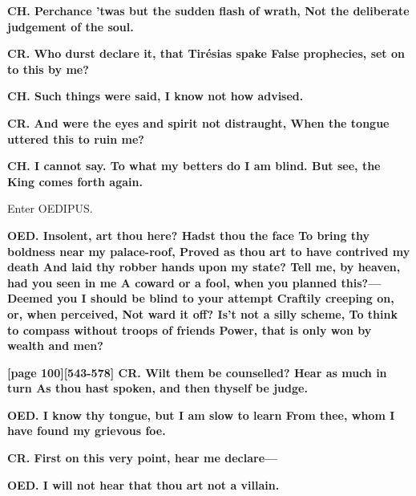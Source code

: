 \documentclass[11pt,letter]{book}
\begin{document}
\par \textbf{CH. Perchance ’twas but the sudden flash of wrath, Not the deliberate judgement of the soul.}
\par 

\par \textbf{CR. Who durst declare it, that Tirésias spake False prophecies, set on to this by me?}
\par 

\par \textbf{CH. Such things were said, I know not how advised.}
\par 

\par \textbf{CR. And were the eyes and spirit not distraught, When the tongue uttered this to ruin me?}
\par 

\par \textbf{CH. I cannot say. To what my betters do I am blind. But see, the King comes forth again.}
\par 

\par  Enter OEDIPUS.

\par \textbf{OED. Insolent, art thou here? Hadst thou the face To bring thy boldness near my palace-roof, Proved as thou art to have contrived my death And laid thy robber hands upon my state? Tell me, by heaven, had you seen in me A coward or a fool, when you planned this?— Deemed you I should be blind to your attempt Craftily creeping on, or, when perceived, Not ward it off? Is’t not a silly scheme, To think to compass without troops of friends Power, that is only won by wealth and men?}
\par 

\par \textbf{[page 100][543-578] CR. Wilt them be counselled? Hear as much in turn As thou hast spoken, and then thyself be judge.}
\par 

\par \textbf{OED. I know thy tongue, but I am slow to learn From thee, whom I have found my grievous foe.}
\par 

\par \textbf{CR. First on this very point, hear me declare—}
\par 

\par \textbf{OED. I will not hear that thou art not a villain.}
\par 
\end{document}
